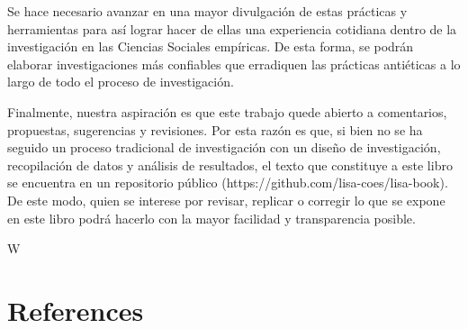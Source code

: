 \documentclass[
  spanish,
  letterpaper,
  DIV=11,
  numbers=noendperiod]{scrreprt}
\begin{document}
Se hace necesario avanzar en una mayor divulgación de estas prácticas y
herramientas para así lograr hacer de ellas una experiencia cotidiana
dentro de la investigación en las Ciencias Sociales empíricas. De esta
forma, se podrán elaborar investigaciones más confiables que erradiquen
las prácticas antiéticas a lo largo de todo el proceso de investigación.

Finalmente, nuestra aspiración es que este trabajo quede abierto a
comentarios, propuestas, sugerencias y revisiones. Por esta razón es
que, si bien no se ha seguido un proceso tradicional de investigación
con un diseño de investigación, recopilación de datos y análisis de
resultados, el texto que constituye a este libro se encuentra en un
repositorio público (https://github.com/lisa-coes/lisa-book). De este
modo, quien se interese por revisar, replicar o corregir lo que se
expone en este libro podrá hacerlo con la mayor facilidad y
transparencia posible.

W


\chapter*{References}\label{references}

\end{document}
